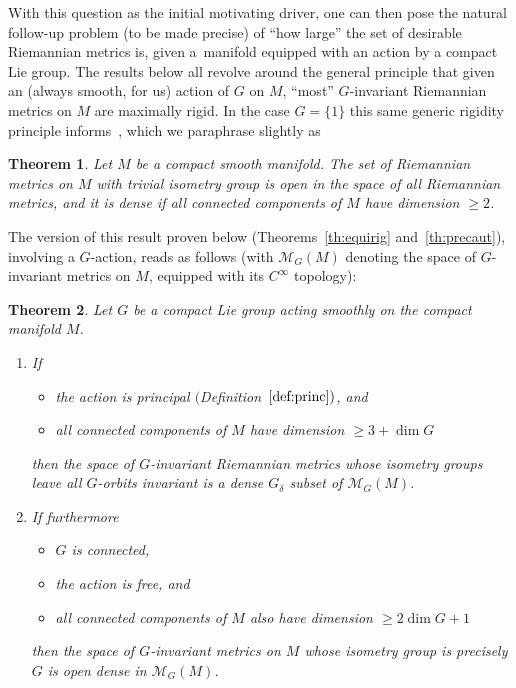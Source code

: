 \documentclass[pdftex]{sigma}%
\numberwithin{equation}{section}
\newtheorem{Theorem}{Theorem}[section]
\begin{document}
With this question as the initial motivating driver, one can then pose the natural follow-up problem (to be made precise) of ``how large'' the set of desirable Riemannian metrics is, given a~manifold equipped with an action by a compact Lie group. The results below all revolve around the general principle that given an (always smooth, for us) action of $G$ on $M$, ``most'' $G$-invariant Riemannian metrics on $M$ are maximally rigid. In the case $G=\{1\}$ this same generic rigidity principle informs~\cite[Corollary~8.2 and Proposition~8.3]{eb}, which we paraphrase slightly as

\begin{Theorem}
 Let $M$ be a compact smooth manifold. The set of Riemannian metrics on $M$ with trivial isometry group is open in the space of all Riemannian metrics, and it is dense if all connected components of $M$ have dimension $\ge 2$.
\end{Theorem}

The version of this result proven below (Theorems~\ref{th:equirig} and~\ref{th:precaut}), involving a $G$-action, reads as follows (with $\mathcal{M}_G(M)$ denoting the space of $G$-invariant metrics on $M$, equipped with its $C^{\infty}$ topology):

\begin{Theorem}\label{th:summ}
 Let $G$ be a compact Lie group acting smoothly on the compact manifold $M$.
 \begin{enumerate}[$(a)$]\itemsep=0pt
 \item\label{item:21} If
 \begin{itemize}\itemsep=0pt
 \item the action is principal $($Definition~$\ref{def:princ})$, and
 \item all connected components of $M$ have dimension $\ge 3+\dim G$
 \end{itemize}
 then the space of $G$-invariant Riemannian metrics whose isometry groups leave all $G$-orbits invariant is a dense $G_{\delta}$ subset of $\mathcal{M}_G(M)$.
 \item\label{item:22} If furthermore
 \begin{itemize}\itemsep=0pt
 \item $G$ is connected,
 \item the action is free, and
 \item all connected components of $M$ also have dimension $\ge 2\dim G+1$
 \end{itemize}
 then the space of $G$-invariant metrics on $M$ whose isometry group is precisely $G$ is open dense in $\mathcal{M}_G(M)$.
 \end{enumerate}
\end{Theorem}
\end{document}

